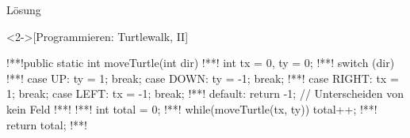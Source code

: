 \begin{frame}[c,fragile]{Lösung}
    \begin{solve}<2->[Programmieren: Turtlewalk, II]
        \begin{plainjava}
!**!public static int moveTurtle(int dir){
!**!    int tx = 0, ty = 0;
!**!    switch (dir) {
!**!        case UP: ty = 1; break; case DOWN: ty = -1; break;
!**!        case RIGHT: tx = 1; break; case LEFT: tx = -1; break;
!**!        default: return -1; // Unterscheiden von kein Feld
!**!    }
!**!    int total = 0;
!**!    while(moveTurtle(tx, ty)) { total++; }
!**!    return total;
!**!}
        \end{plainjava}
    \end{solve}
\end{frame}
\fi
